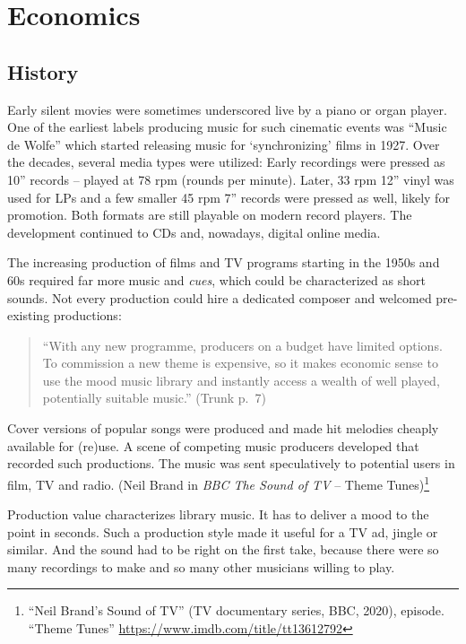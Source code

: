 \documentclass[a4paper,
fontsize=11pt,
oneside,
numbers=noperiodatend,
parskip=half-,
bibliography=totoc,
final
]{scrartcl}
\begin{document}
\hypertarget{economics}{%
\section{Economics}\label{economics}}

\hypertarget{history}{%
\subsection{History}\label{history}}

Early silent movies were sometimes underscored live by a piano or organ
player. One of the earliest labels producing music for such cinematic
events was \enquote{Music de Wolfe} which started releasing music for
\enquote*{synchronizing} films in 1927. Over the decades, several media
types were utilized: Early recordings were pressed as 10'' records --
played at 78 rpm (rounds per minute). Later, 33 rpm 12'' vinyl was used
for LPs and a few smaller 45 rpm 7'' records were pressed as well,
likely for promotion. Both formats are still playable on modern record
players. The development continued to CDs and, nowadays, digital online
media.

The increasing production of films and TV programs starting in the 1950s
and 60s required far more music and \emph{cues}, which could be
characterized as short sounds. Not every production could hire a
dedicated composer and welcomed pre-existing productions:

\begin{quote}
\enquote{With any new programme, producers on a budget have limited
options. To commission a new theme is expensive, so it makes economic
sense to use the mood music library and instantly access a wealth of
well played, potentially suitable music.} (Trunk p.~7)
\end{quote}

Cover versions of popular songs were produced and made hit melodies
cheaply available for (re)use. A scene of competing music producers
developed that recorded such productions. The music was sent
speculatively to potential users in film, TV and radio. (Neil Brand in
\emph{BBC The Sound of TV} -- Theme Tunes)\footnote{\enquote{Neil
  Brand's Sound of TV} (TV documentary series, BBC, 2020), episode.
  \enquote{Theme Tunes} \url{https://www.imdb.com/title/tt13612792}}

Production value characterizes library music. It has to deliver a mood
to the point in seconds. Such a production style made it useful for a TV
ad, jingle or similar. And the sound had to be right on the first take,
because there were so many recordings to make and so many other
musicians willing to play.
\end{document}
